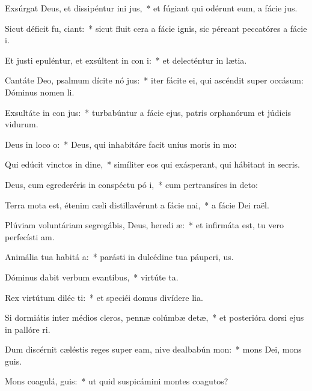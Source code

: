 \item Exsúrgat Deus, et dissipéntur ini jus,~* et fúgiant qui odérunt eum, a fácie jus.
\item Sicut déficit fu, ciant:~* sicut fluit cera a fácie ignis, sic péreant peccatóres a fácie i.
\item Et justi epuléntur, et exsúltent in con i:~* et delecténtur in lætia.
\item Cantáte Deo, psalmum dícite nó jus:~* iter fácite ei, qui ascéndit super occásum: Dóminus nomen li.
\item Exsultáte in con jus:~* turbabúntur a fácie ejus, patris orphanórum et júdicis vidurum.
\item Deus in loco  o:~* Deus, qui inhabitáre facit uníus moris in mo:
\item Qui edúcit vinctos in dine,~* simíliter eos qui exásperant, qui hábitant in secris.
\item Deus, cum egrederéris in conspéctu pó i,~* cum pertransíres in deto:
\item Terra mota est, étenim cæli distillavérunt a fácie  nai,~* a fácie Dei raël.
\item Plúviam voluntáriam segregábis, Deus, heredi æ:~* et infirmáta est, tu vero perfecísti am.
\item Animália tua habitá  a:~* parásti in dulcédine tua páuperi, us.
\item Dóminus dabit verbum evantibus,~* virtúte ta.
\item Rex virtútum diléc ti:~* et speciéi domus divídere lia.
\item Si dormiátis inter médios cleros, pennæ colúmbæ detæ,~* et posterióra dorsi ejus in pallóre ri.
\item Dum discérnit cæléstis reges super eam, nive dealbabún  mon:~* mons Dei, mons guis.
\item Mons coagulá,  guis:~* ut quid suspicámini montes coagutos?
